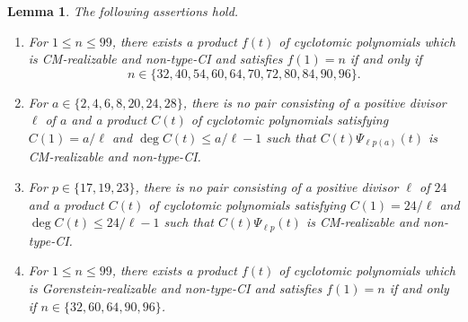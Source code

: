 \documentclass[11pt,a4paper]{amsart}
\newtheorem{lemma}[lemma]{Lemma}
\theoremstyle{definition}
\theoremstyle{remark}
\begin{document}
\begin{lemma}\label{lem:finite-checks}
The following assertions hold.
\begin{enumerate}[label=\textup{(\roman*)}]
\item For $1\le n\le99$, there exists a product $f(t)$ of cyclotomic polynomials which is CM-realizable and non-type-CI and satisfies $f(1)=n$ if and only if
\[n\in\{32,40,54,60,64,70,72,80,84,90,96\}.\]
\item For $a\in\{2,4,6,8,20,24,28\}$, there is no pair consisting of a positive divisor $\ell$ of $a$ and a product $C(t)$ of cyclotomic polynomials satisfying $C(1)=a/\ell$ and $\deg C(t)\le a/\ell-1$ such that $C(t)\Psi_{\ell p(a)}(t)$ is CM-realizable and non-type-CI.
\item For $p\in\{17,19,23\}$, there is no pair consisting of a positive divisor $\ell$ of $24$ and a product $C(t)$ of cyclotomic polynomials satisfying $C(1)=24/\ell$ and $\deg C(t)\le24/\ell-1$ such that $C(t)\Psi_{\ell p}(t)$ is CM-realizable and non-type-CI.
\item For $1\le n\le99$, there exists a product $f(t)$ of cyclotomic polynomials which is Gorenstein-realizable and non-type-CI and satisfies $f(1)=n$ if and only if $n\in\{32,60,64,90,96\}$.
\end{enumerate}
\end{lemma}
\end{document}
